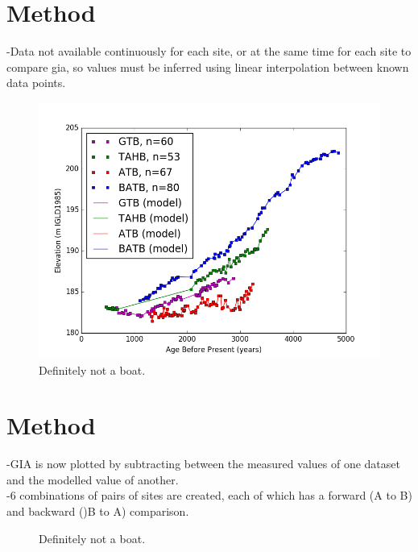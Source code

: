 \documentclass{article}
\begin{document}
\section[2]{Method}
-Data not available continuously for each site, or at the same time for each site to compare gia, so values must be inferred using linear interpolation between known data points.\\
\begin{figure}[h]
	\includegraphics[width=\linewidth]{data/theData.png}
	\caption{Definitely not a boat.}
	\label{fig:dataWithModel}
\end{figure}
\newpage
\section[2]{Method}
-GIA is now plotted by subtracting between the measured values of one dataset and the modelled value of another.\\
-6 combinations of pairs of sites are created, each of which has a forward (A to B) and backward ()B to A) comparison.\\
\newpage
\begin{figure}[t]
	\caption{Definitely not a boat.}
	\label{fig:data_ATBxBATB}
\end{figure}
\newpage
\end{document}
